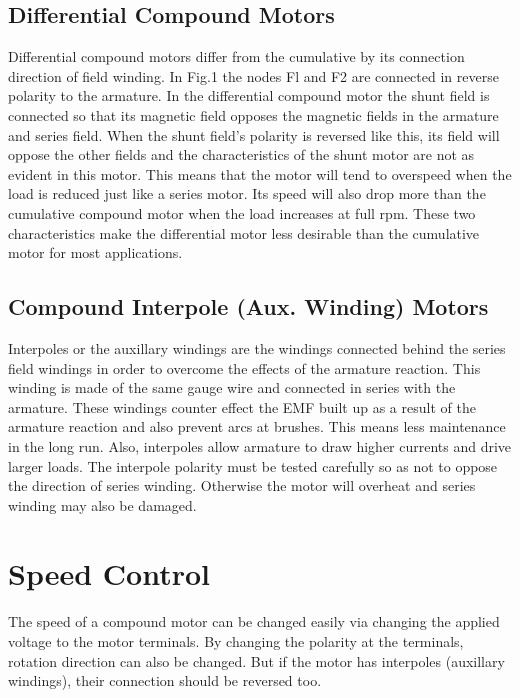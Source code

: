 \subsection{Differential Compound Motors} %

Differential compound motors differ from the cumulative by its connection direction of field winding. In Fig.1 the nodes Fl and F2 are connected in reverse polarity to the armature. In the differential compound motor the shunt field is connected so that its magnetic field opposes the magnetic fields in the armature and series field. When the shunt field's polarity is reversed like this, its field will oppose the other fields and the characteristics of the shunt motor are not as evident in this motor. This means that the motor will tend to overspeed when the load is reduced just like a series motor. Its speed will also drop more than the cumulative compound motor when the load increases at full rpm. These two characteristics make the differential motor less desirable than the cumulative motor for most applications.

\subsection{Compound Interpole (Aux. Winding) Motors} %

Interpoles or the auxillary windings are the windings connected behind the series field windings in order to overcome the effects of the armature reaction. This winding is made of the same gauge wire and connected in series with the armature. These windings counter effect the EMF built up as a result of the armature reaction and also prevent arcs at brushes. This means less maintenance in the long run. Also, interpoles allow armature to draw higher currents and drive larger loads.
The interpole polarity must be tested carefully so as not to oppose the direction of series winding. Otherwise the motor will overheat and series winding may also be damaged.


\section{Speed Control} %

The speed of a compound motor can be changed easily via changing the applied voltage to the motor terminals. By changing the polarity at the terminals, rotation direction can also be changed. But if the motor has interpoles (auxillary windings), their connection should be reversed too.

